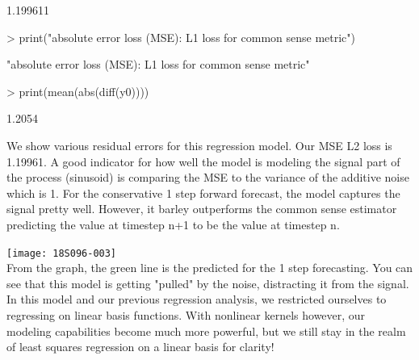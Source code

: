 \documentclass{article}
\begin{document}
\begin{Schunk}
\begin{Sinput}
\end{Sinput}
\begin{Soutput}
[1] 1.199611
\end{Soutput}
\begin{Sinput}
> print("absolute error loss (MSE): L1  loss for common sense metric")
\end{Sinput}
\begin{Soutput}
[1] "absolute error loss (MSE): L1  loss for common sense metric"
\end{Soutput}
\begin{Sinput}
> print(mean(abs(diff(y0))))
\end{Sinput}
\begin{Soutput}
[1] 1.2054
\end{Soutput}
\end{Schunk}
We show various residual errors for this regression model. Our MSE L2 loss is 1.19961. A good indicator for how well the model is modeling the signal part of the process (sinusoid) is comparing the MSE to the variance of the additive noise which is 1. For the conservative 1 step forward forecast, the model captures the signal pretty well. However, it barley outperforms the common sense estimator predicting the value at timestep n+1 to be the value at timestep n.
\begin{Schunk}
\end{Schunk}
\texttt{[image: 18S096-003]}
\\
From the graph, the green line is the predicted for the 1 step forecasting. You can see that this model is getting "pulled" by the noise, distracting it from the signal.
In this model and our previous regression analysis, we restricted ourselves to regressing on linear basis functions. With nonlinear kernels however, our modeling capabilities become much more powerful, but we still stay in the realm of least squares regression on a linear basis for clarity! 
\end{document}
